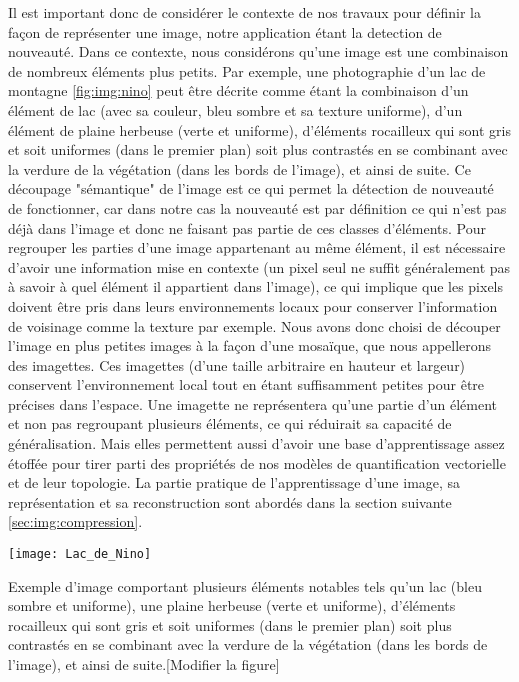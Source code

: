 	Il est important donc de considérer le contexte de nos travaux pour définir la façon de représenter une image, notre application étant la detection de nouveauté. Dans ce contexte, nous considérons qu'une image est une combinaison de nombreux éléments plus petits. Par exemple, une photographie d'un lac de montagne \ref{fig:img:nino} peut être décrite comme étant la combinaison d'un élément de lac (avec sa couleur, bleu sombre et sa texture uniforme), d'un élément de plaine herbeuse (verte et uniforme), d'éléments rocailleux qui sont gris et soit uniformes (dans le premier plan) soit plus contrastés en se combinant avec la verdure de la végétation (dans les bords de l'image), et ainsi de suite. Ce découpage "sémantique" de l'image est ce qui permet la détection de nouveauté  de fonctionner, car dans notre cas la nouveauté est par définition ce qui n'est pas déjà dans l'image et donc ne faisant pas partie de ces classes d'éléments. Pour regrouper les parties d'une image appartenant au même élément, il est nécessaire d'avoir une information mise en contexte (un pixel seul ne suffit généralement pas à savoir à quel élément il appartient dans l'image), ce qui implique que les pixels doivent être pris dans leurs environnements locaux pour conserver l'information de voisinage comme la texture par exemple. Nous avons donc choisi de découper l'image en plus petites images à la façon d'une mosaïque, que nous appellerons des imagettes. Ces imagettes (d'une taille arbitraire en hauteur et largeur) conservent l'environnement local tout en étant suffisamment petites pour être précises dans l'espace. Une imagette ne représentera qu'une partie d'un élément et non pas regroupant plusieurs éléments, ce qui réduirait sa capacité de généralisation. Mais elles permettent aussi d'avoir une base d'apprentissage assez étoffée pour tirer parti des propriétés de nos modèles de quantification vectorielle et de leur topologie. La partie pratique de l'apprentissage d'une image, sa représentation et sa reconstruction sont abordés dans la section suivante \ref{sec:img:compression}.


	\begin{figureth}
		\texttt{[image: Lac\_de\_Nino]}
		\caption[Lac de Nino]{Exemple d'image comportant plusieurs éléments notables tels qu'un lac (bleu sombre et uniforme), une plaine herbeuse (verte et uniforme), d'éléments rocailleux qui sont gris et soit uniformes (dans le premier plan) soit plus contrastés en se combinant avec la verdure de la végétation (dans les bords de l'image), et ainsi de suite.[Modifier la figure]}\label{fig:img:nino}
	\end{figureth}

